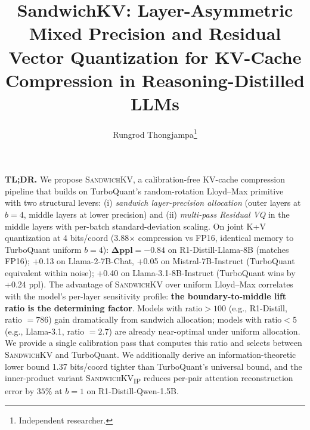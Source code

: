 \documentclass[11pt]{article}
\title{\textbf{SandwichKV: Layer-Asymmetric Mixed Precision and Residual Vector Quantization for KV-Cache Compression in Reasoning-Distilled LLMs}}
\author{Rungrod Thongjampa\thanks{Independent researcher.}}
\date{}
\theoremstyle{definition}
\newcommand{\eq}{\textsc{SandwichKV}}
\newcommand{\eqp}{\textsc{SandwichKV}\textsubscript{IP}}
\begin{document}
\maketitle
\vspace{-0.5em}

\begin{tldr}
\textbf{TL;DR.} We propose \eq{}, a calibration-free KV-cache compression pipeline that builds on TurboQuant's random-rotation Lloyd--Max primitive~\citep{turboquant} with two structural levers: (i) \emph{sandwich layer-precision allocation} (outer layers at $b{=}4$, middle layers at lower precision) and (ii) \emph{multi-pass Residual VQ} in the middle layers with per-batch standard-deviation scaling. On joint K+V quantization at 4 bits/coord (3.88$\times$ compression vs FP16, identical memory to TurboQuant uniform $b{=}4$): $\boldsymbol{\Delta\text{ppl}=-0.84}$ on R1-Distill-Llama-8B (matches FP16); +0.13 on Llama-2-7B-Chat, +0.05 on Mistral-7B-Instruct (TurboQuant equivalent within noise); +0.40 on Llama-3.1-8B-Instruct (TurboQuant wins by +0.24 ppl). The advantage of \eq{} over uniform Lloyd--Max correlates with the model's per-layer sensitivity profile: \textbf{the boundary-to-middle lift ratio is the determining factor}. Models with $\text{ratio} > 100$ (e.g., R1-Distill, ratio $=786$) gain dramatically from sandwich allocation; models with $\text{ratio} < 5$ (e.g., Llama-3.1, ratio $=2.7$) are already near-optimal under uniform allocation. We provide a single calibration pass that computes this ratio and selects between \eq{} and TurboQuant. We additionally derive an information-theoretic lower bound 1.37 bits/coord tighter than TurboQuant's universal bound, and the inner-product variant \eqp{} reduces per-pair attention reconstruction error by $35\%$ at $b{=}1$ on R1-Distill-Qwen-1.5B.
\end{tldr}
\end{document}
